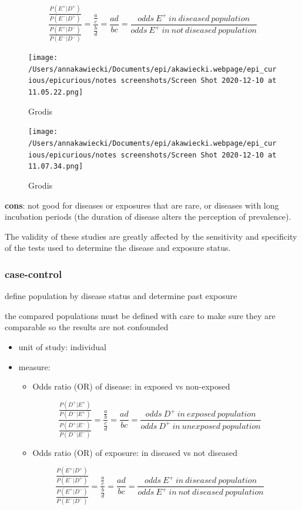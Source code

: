 \documentclass[
]{article}
\providecommand{\tightlist}{%
  \setlength{\itemsep}{0pt}\setlength{\parskip}{0pt}}
\begin{document}
\[\frac{\frac{P(E^+|D^+)}{P(E^-|D^+)}}{\frac{P(E^+|D^-)}{P(E^-|D^-)}}=\frac{\frac{a}{c}}{\frac{b}{d}}=\frac{ad}{bc}=\frac{odds\:E^+\:in\:diseased\:population}{odds\:E^+\:in\:not\:diseased\:population}\]

\begin{figure}
\centering
\texttt{[image: /Users/annakawiecki/Documents/epi/akawiecki.webpage/epi\_curious/epicurious/notes screenshots/Screen Shot 2020-12-10 at 11.05.22.png]}
\caption{Grodis}
\end{figure}

\begin{figure}
\centering
\texttt{[image: /Users/annakawiecki/Documents/epi/akawiecki.webpage/epi\_curious/epicurious/notes screenshots/Screen Shot 2020-12-10 at 11.07.34.png]}
\caption{Grodis}
\end{figure}

\textbf{cons}: not good for diseases or exposures that are rare, or
diseases with long incubation periods (the duration of disease alters
the perception of prevalence).

The validity of these studies are greatly affected by the sensitivity
and specificity of the tests used to determine the disease and exposure
status.

\hypertarget{case-control}{%
\subsubsection{case-control}\label{case-control}}

define population by disease status and determine past exposure

the compared populations must be defined with care to make sure they are
comparable so the results are not confounded

\begin{itemize}
\item
  unit of study: individual
\item
  measure:

  \begin{itemize}
  \tightlist
  \item
    Odds ratio (OR) of disease: in exposed vs non-exposed
  \end{itemize}

  \[\frac{\frac{P(D^+|E^+)}{P(D^-|E^+)}}{\frac{P(D^+|E^-)}{P(D^-|E^-)}}=\frac{\frac{a}{b}}{\frac{c}{d}}=\frac{ad}{bc}=\frac{odds\:D^+\:in\:exposed\:population}{odds\:D^+\:in\:unexposed\:population}\]

  \begin{itemize}
  \tightlist
  \item
    Odds ratio (OR) of exposure: in diseased vs not diseased
  \end{itemize}

  \[\frac{\frac{P(E^+|D^+)}{P(E^-|D^+)}}{\frac{P(E^+|D^-)}{P(E^-|D^-)}}=\frac{\frac{a}{c}}{\frac{b}{d}}=\frac{ad}{bc}=\frac{odds\:E^+\:in\:diseased\:population}{odds\:E^+\:in\:not\:diseased\:population}\]
\end{itemize}
\end{document}
